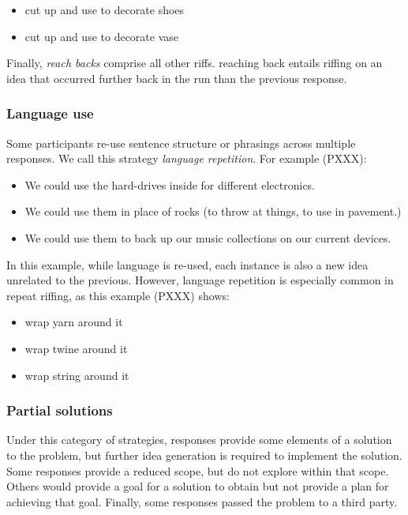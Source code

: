 \begin{itemize}
\item cut up and use to decorate shoes
\item cut up and use to decorate vase
\end{itemize}

Finally, \emph{reach backs} comprise all other riffs. reaching back entails riffing on an idea that occurred further back in the run than the previous response. 

\subsubsection{Language use}

Some participants re-use sentence structure or phrasings across multiple responses. We call this strategy \emph{language repetition}. For example (PXXX):

\begin{itemize}
    \item We could use the hard-drives inside for different electronics.
    \item We could use them in place of rocks (to throw at things, to use in pavement.)
    \item We could use them to back up our music collections on our current devices.
\end{itemize}

In this example, while language is re-used, each instance is also a new idea unrelated to the previous.
However, language repetition is especially common in repeat riffing, as this example (PXXX) shows:

\begin{itemize}
    \item wrap yarn around it
    \item wrap twine around it
    \item wrap string around it
\end{itemize}

\subsubsection{Partial solutions}

Under this category of strategies, responses provide some elements of a solution to the problem, but further idea generation is required to implement the solution. Some responses provide a reduced scope, but do not explore within that scope. Others would provide a goal for a solution to obtain but not provide a plan for achieving that goal. Finally, some responses passed the problem to a third party.

